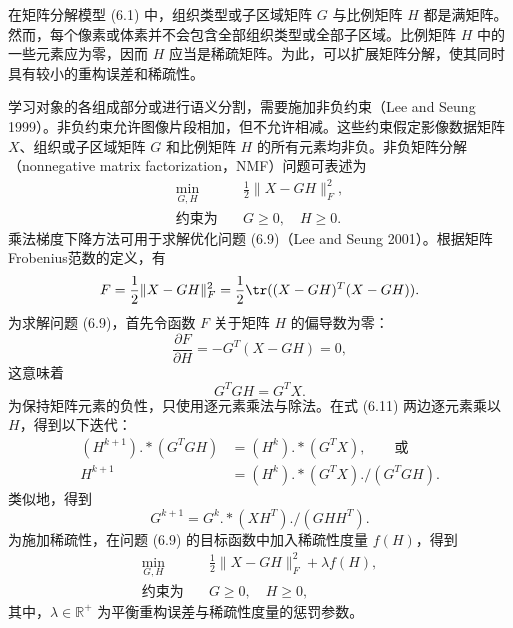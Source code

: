 
在矩阵分解模型 (6.1) 中，组织类型或子区域矩阵 $G$ 与比例矩阵 $H$ 都是满矩阵。然而，每个像素或体素并不会包含全部组织类型或全部子区域。比例矩阵 $H$ 中的一些元素应为零，因而 $H$ 应当是稀疏矩阵。为此，可以扩展矩阵分解，使其同时具有较小的重构误差和稀疏性。

学习对象的各组成部分或进行语义分割，需要施加非负约束（Lee and Seung 1999）。非负约束允许图像片段相加，但不允许相减。这些约束假定影像数据矩阵 $X$、组织或子区域矩阵 $G$ 和比例矩阵 $H$ 的所有元素均非负。非负矩阵分解（nonnegative matrix factorization，NMF）问题可表述为
\begin{equation}
\begin{aligned}
\min_{G,H}\quad&\frac12\lVert X-GH\rVert_F^2,\\
\text{约束为}\quad&G\geq0,\quad H\geq0.
\end{aligned}
\tag{6.9}
\end{equation}
乘法梯度下降方法可用于求解优化问题 (6.9)（Lee and Seung 2001）。根据矩阵 Frobenius范数的定义，有
\[
F=\frac12\lVert X-GH\rVert_F^2
=\frac12\tr((X-GH)^T(X-GH)).
\]
为求解问题 (6.9)，首先令函数 $F$ 关于矩阵 $H$ 的偏导数为零：
\begin{equation}
\frac{\partial F}{\partial H}=-G^T(X-GH)=0,
\tag{6.10}
\end{equation}
这意味着
\begin{equation}
G^TGH=G^TX.
\tag{6.11}
\end{equation}
为保持矩阵元素的负性，只使用逐元素乘法与除法。在式 (6.11) 两边逐元素乘以 $H$，得到以下迭代：
\begin{equation}
\begin{aligned}
(H^{k+1})\mathbin{.*}(G^TGH)&=(H^k)\mathbin{.*}(G^TX),\qquad\text{或}\\
H^{k+1}&=(H^k)\mathbin{.*}(G^TX)\mathbin{./}(G^TGH).
\end{aligned}
\tag{6.12}
\end{equation}
类似地，得到
\begin{equation}
G^{k+1}=G^k\mathbin{.*}(XH^T)\mathbin{./}(GH H^T).
\tag{6.13}
\end{equation}
为施加稀疏性，在问题 (6.9) 的目标函数中加入稀疏性度量 $f(H)$，得到
\begin{equation}
\begin{aligned}
\min_{G,H}\quad&\frac12\lVert X-GH\rVert_F^2+\lambda f(H),\\
\text{约束为}\quad&G\geq0,\quad H\geq0,
\end{aligned}
\tag{6.14}
\end{equation}
其中，$\lambda\in\mathbb R^+$ 为平衡重构误差与稀疏性度量的惩罚参数。

